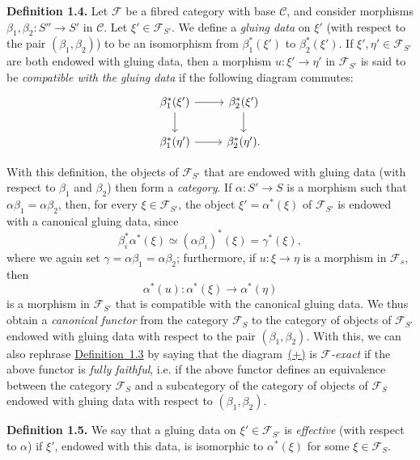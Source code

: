 \documentclass{article}
\newenvironment{rmenv}[1]
  {\phantomsection\par\medskip\noindent\textbf{#1.}\rmfamily}
  {\par\medskip}
\renewcommand{\cal}[1]{{\mathcal{#1}}}
\newcommand{\oldpage}[1]{\marginpar{\footnotesize$\Big\vert$ \textit{p.~#1}}}
\begin{document}
\begin{rmenv}{Definition 1.4}
  Let $\cal{F}$ be a fibred category with base $\cal{C}$, and consider morphisms $\beta_1,\beta_2\colon S''\to S'$ in $\cal{C}$.
  Let $\xi'\in\cal{F}_{S'}$.
  We define a \emph{gluing data} on $\xi'$ (with respect to the pair $(\beta_1,\beta_2)$) to be an isomorphism from $\beta_1^*(\xi')$ to $\beta_2^*(\xi')$.
  If $\xi',\eta'\in\cal{F}_{S'}$ are both endowed with gluing data, then a morphism $u\colon\xi'\to\eta'$ in $\cal{F}_{S'}$ is said to be \emph{compatible with the gluing data} if the following diagram commutes:
  \[
    \begin{tikzcd}
      \beta_1^*(\xi') \rar \dar
      &\beta_2^*(\xi') \dar
    \\\beta_1^*(\eta') \rar
      &\beta_2^*(\eta').
    \end{tikzcd}
  \]
\end{rmenv}

With this definition, the objects of $\cal{F}_{S'}$ that are endowed with gluing data (with respect to $\beta_1$ and $\beta_2$) then form a \emph{category}.
If $\alpha\colon S'\to S$ is a morphism such that $\alpha\beta_1=\alpha\beta_2$, then, for every $\xi\in\cal{F}_{S'}$, the object $\xi'=\alpha^*(\xi)$
\oldpage{190-04}
of $\cal{F}_{S'}$ is endowed with a canonical gluing data, since
\[
  \beta_i^*\alpha^*(\xi)
  \simeq (\alpha\beta_i)^*(\xi)
  = \gamma^*(\xi),
\]
where we again set $\gamma=\alpha\beta_1=\alpha\beta_2$;
furthermore, if $u\colon\xi\to\eta$ is a morphism in $\cal{F}_s$, then
\[
  \alpha^*(u)\colon \alpha^*(\xi) \to \alpha^*(\eta)
\]
is a morphism in $\cal{F}_{S'}$ that is compatible with the canonical gluing data.
We thus obtain a \emph{canonical functor} from the category $\cal{F}_S$ to the category of objects of $\cal{F}_{S'}$ endowed with gluing data with respect to the pair $(\beta_1,\beta_2)$.
With this, we can also rephrase \hyperref[definition:A.1.3]{Definition~1.3} by saying that the diagram~\hyperref[equation-definition:A.1.3]{(+)} is \emph{$\cal{F}$-exact} if the above functor is \emph{fully faithful}, i.e. if the above functor defines an equivalence between the category $\cal{F}_S$ and a subcategory of the category of objects of $\cal{F}_S$ endowed with gluing data with respect to $(\beta_1,\beta_2)$.

\begin{rmenv}{Definition 1.5}
\label{definition:A.1.5}
  We say that a gluing data on $\xi'\in\cal{F}_{S'}$ is \emph{effective} (with respect to $\alpha$) if $\xi'$, endowed with this data, is isomorphic to $\alpha^*(\xi)$ for some $\xi\in\cal{F}_S$.
\end{rmenv}
\end{document}
